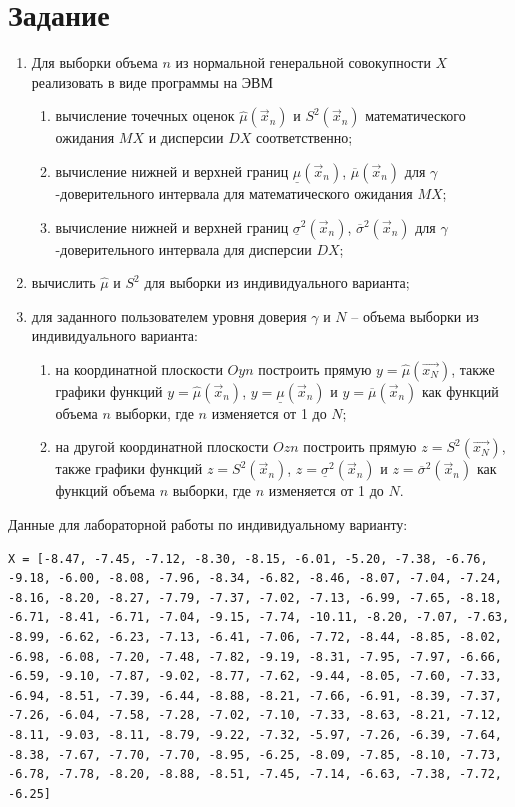 \setcounter{page}{3}
\chapter{Задание}


\begin{enumerate}
	\item Для выборки объема $n$ из нормальной генеральной совокупности $X$ реализовать в виде программы на ЭВМ
	\begin{enumerate}
		\item вычисление точечных оценок $\hat\mu(\vec x_n)$ и $S^2(\vec x_n)$ математического ожидания $MX$ и дисперсии $DX$ соответственно;
		\item вычисление нижней и верхней границ $\underline\mu(\vec x_n)$, $\overline\mu(\vec x_n)$ для $\gamma$-доверительного интервала для математического ожидания $MX$;
		\item вычисление нижней и верхней границ $\underline\sigma^2(\vec x_n)$, $\overline\sigma^2(\vec x_n)$ для $\gamma$-доверительного интервала для дисперсии $DX$;
	\end{enumerate}
	\item вычислить $\hat\mu$ и $S^2$ для выборки из индивидуального варианта;
	\item для заданного пользователем уровня доверия $\gamma$ и $N$ – объема выборки из индивидуального варианта:
	\begin{enumerate}
		\item на координатной плоскости $Oyn$ построить прямую $y = \hat\mu(\vec{x_N})$, также графики функций $y = \hat\mu(\vec x_n)$, $y = \underline\mu(\vec x_n)$ и $y = \overline\mu(\vec x_n)$ как функций объема $n$ выборки, где $n$ изменяется от 1 до $N$;
		\item на другой координатной плоскости $Ozn$ построить прямую $z = S^2(\vec{x_N})$, также графики функций $z = S^2(\vec x_n)$, $z = \underline\sigma^2(\vec x_n)$ и $z = \overline\sigma^2(\vec x_n)$ как функций объема $n$ выборки, где $n$ изменяется от 1 до $N$.
	\end{enumerate}
\end{enumerate}


Данные для лабораторной работы по индивидуальному варианту:

\begin{lstlisting}
X = [-8.47, -7.45, -7.12, -8.30, -8.15, -6.01, -5.20, -7.38, -6.76, -9.18, -6.00, -8.08, -7.96, -8.34, -6.82, -8.46, -8.07, -7.04, -7.24, -8.16, -8.20, -8.27, -7.79, -7.37, -7.02, -7.13, -6.99, -7.65, -8.18, -6.71, -8.41, -6.71, -7.04, -9.15, -7.74, -10.11, -8.20, -7.07, -7.63, -8.99, -6.62, -6.23, -7.13, -6.41, -7.06, -7.72, -8.44, -8.85, -8.02, -6.98, -6.08, -7.20, -7.48, -7.82, -9.19, -8.31, -7.95, -7.97, -6.66, -6.59, -9.10, -7.87, -9.02, -8.77, -7.62, -9.44, -8.05, -7.60, -7.33, -6.94, -8.51, -7.39, -6.44, -8.88, -8.21, -7.66, -6.91, -8.39, -7.37, -7.26, -6.04, -7.58, -7.28, -7.02, -7.10, -7.33, -8.63, -8.21, -7.12, -8.11, -9.03, -8.11, -8.79, -9.22, -7.32, -5.97, -7.26, -6.39, -7.64, -8.38, -7.67, -7.70, -7.70, -8.95, -6.25, -8.09, -7.85, -8.10, -7.73, -6.78, -7.78, -8.20, -8.88, -8.51, -7.45, -7.14, -6.63, -7.38, -7.72, -6.25]
\end{lstlisting}

